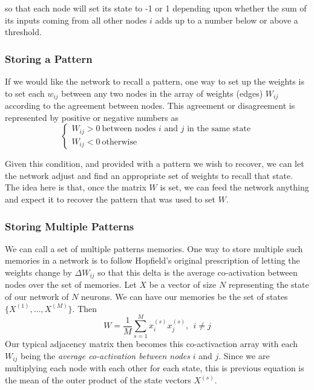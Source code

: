 \documentclass[11pt]{article}
\begin{document}
	so that each node will set its state to -1 or 1 depending upon whether the sum of its inputs coming from all other nodes $i$ adds up to a number below or above a threshold.
	
%	
	
	\subsubsection{Storing a Pattern}
	If we would like the network to recall a pattern, one way to set up the weights is to set each $w_{ij}$ between any two nodes in the array of weights (edges) $W_{ij}$ according to the agreement between nodes. This agreement or disagreement is represented by positive or negative numbers as
	\begin{equation}
	\begin{cases}
		W_{ij} > 0 \ \text{between nodes $i$ and $j$ in the same state}\\
		W_{ij} < 0 \ \text{otherwise}
	\end{cases}
	\end{equation}
	
	Given this condition, and provided with a pattern we wish to recover, we can let the network adjust and find an appropriate set of weights to recall that state. The idea here is that, once the matrix $W$ is set, we can feed the network anything and expect it to recover the pattern that was used to set $W$.  

	\subsubsection{Storing Multiple Patterns}
	We can call a set of multiple patterns memories. One way to store multiple such memories in a network is to follow Hopfield's original prescription of letting the weights change by $\Delta W_{ij}$ so that this delta is the average co-activation between nodes over the set of memories. Let $X$ be a vector of size $N$ representing the state of our network of $N$ neurons. We can have our memories be the set of states  $\{ X^{(1)}, \ldots, X^{(M)} \}$. Then
	\begin{equation}
		W = \frac{1}{M} \sum^{M}_{s=1} x^{(s)}_i x_j^{(s)}, \ \ i\neq j
	\end{equation}
	Our typical adjacency matrix then becomes this co-activaction array with each $W_{ij}$ being the \textit{average co-activation between nodes} $i$ and $j$. Since we are multiplying each node with each other for each state, this is previous equation is the mean of the outer product of the state vectors $X^{(s)}$.
	
\end{document}

